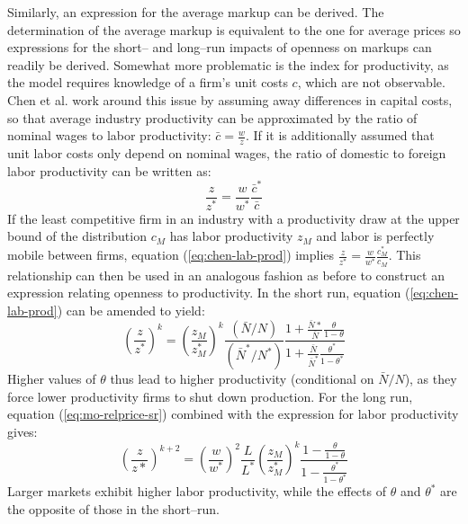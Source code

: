 \documentclass[a4paper,12pt]{article}
\begin{document}
Similarly, an expression for the average markup can be derived. The determination of the average markup is equivalent to the one for average prices so expressions for the short-- and long--run impacts of openness on markups can readily be derived. Somewhat more problematic is the index for productivity, as the model requires knowledge of a firm's unit costs $c$, which are not observable. Chen et al. work around this issue by assuming away differences in capital costs, so that average industry productivity can be approximated by the ratio of nominal wages to labor productivity: $\bar{c} = \frac{w}{z}$. If it is additionally assumed that unit labor costs only depend on nominal wages, the ratio of domestic to foreign labor productivity can be written as:
\begin{equation}\label{eq:chen-lab-prod}
\frac{z}{z^*} = \frac{w}{w^*} \frac{\bar{c}^*}{\bar{c}}
\end{equation}
If the least competitive firm in an industry with a productivity draw at the upper bound of the distribution $c_M$ has labor productivity $z_M$ and labor is perfectly mobile between firms, equation (\ref{eq:chen-lab-prod}) implies $\frac{z}{z^*} = \frac{w}{w^*} \frac{c_M^*}{c_M}$. This relationship can then be used in an analogous fashion as before to construct an expression relating openness to productivity. In the short run, equation (\ref{eq:chen-lab-prod}) can be amended to yield:
\begin{equation}\label{eq:chen-prod-sr}
\left( \frac{z}{z^*} \right)^k = \left( \frac{z_M}{z_M^*} \right)^k \frac{(\bar{N}/N)}{(\bar{N}^*/N^*)} \frac{1+ \frac{\bar{N}*}{\bar{N}} \frac{\theta}{1-\theta}}{1+ \frac{\bar{N}}{\bar{N}^*} \frac{\theta^*}{1-\theta^*}} 
\end{equation}
Higher values of $\theta$ thus lead to higher productivity (conditional on $\bar{N}/N$), as they force lower productivity firms to shut down production. For the long run, equation (\ref{eq:mo-relprice-sr}) combined with the expression for labor productivity gives:
\begin{equation}\label{eq:chen-prod-lr}
\left( \frac{z}{z*} \right)^{k+2} = \left( \frac{w}{w^*} \right)^2 \frac{L}{L^*} \left( \frac{z_M}{z_M^*} \right)^k \frac{1-\frac{\theta}{1-\theta}}{1-\frac{\theta^*}{1-\theta^*}}
\end{equation} 
Larger markets exhibit higher labor productivity, while the effects of $\theta$ and $\theta^*$ are the opposite of those in the short--run.

\end{document}
